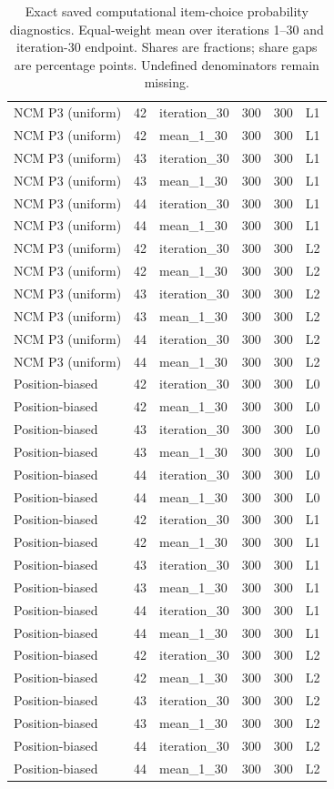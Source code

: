 \begin{table}[htbp!]
\begin{tabular}{lrlrrl}
NCM P3 (uniform) & 42 & iteration\_30 & 300 & 300 & L1 \\
NCM P3 (uniform) & 42 & mean\_1\_30 & 300 & 300 & L1 \\
NCM P3 (uniform) & 43 & iteration\_30 & 300 & 300 & L1 \\
NCM P3 (uniform) & 43 & mean\_1\_30 & 300 & 300 & L1 \\
NCM P3 (uniform) & 44 & iteration\_30 & 300 & 300 & L1 \\
NCM P3 (uniform) & 44 & mean\_1\_30 & 300 & 300 & L1 \\
NCM P3 (uniform) & 42 & iteration\_30 & 300 & 300 & L2 \\
NCM P3 (uniform) & 42 & mean\_1\_30 & 300 & 300 & L2 \\
NCM P3 (uniform) & 43 & iteration\_30 & 300 & 300 & L2 \\
NCM P3 (uniform) & 43 & mean\_1\_30 & 300 & 300 & L2 \\
NCM P3 (uniform) & 44 & iteration\_30 & 300 & 300 & L2 \\
NCM P3 (uniform) & 44 & mean\_1\_30 & 300 & 300 & L2 \\
Position-biased & 42 & iteration\_30 & 300 & 300 & L0 \\
Position-biased & 42 & mean\_1\_30 & 300 & 300 & L0 \\
Position-biased & 43 & iteration\_30 & 300 & 300 & L0 \\
Position-biased & 43 & mean\_1\_30 & 300 & 300 & L0 \\
Position-biased & 44 & iteration\_30 & 300 & 300 & L0 \\
Position-biased & 44 & mean\_1\_30 & 300 & 300 & L0 \\
Position-biased & 42 & iteration\_30 & 300 & 300 & L1 \\
Position-biased & 42 & mean\_1\_30 & 300 & 300 & L1 \\
Position-biased & 43 & iteration\_30 & 300 & 300 & L1 \\
Position-biased & 43 & mean\_1\_30 & 300 & 300 & L1 \\
Position-biased & 44 & iteration\_30 & 300 & 300 & L1 \\
Position-biased & 44 & mean\_1\_30 & 300 & 300 & L1 \\
Position-biased & 42 & iteration\_30 & 300 & 300 & L2 \\
Position-biased & 42 & mean\_1\_30 & 300 & 300 & L2 \\
Position-biased & 43 & iteration\_30 & 300 & 300 & L2 \\
Position-biased & 43 & mean\_1\_30 & 300 & 300 & L2 \\
Position-biased & 44 & iteration\_30 & 300 & 300 & L2 \\
Position-biased & 44 & mean\_1\_30 & 300 & 300 & L2 \\
\hline
\end{tabular}
\caption{Exact saved computational item-choice probability diagnostics. Equal-weight mean over iterations 1--30 and iteration-30 endpoint. Shares are fractions; share gaps are percentage points. Undefined denominators remain missing.}
\label{chap:results:tab:rq2_computational_saved_probability_coverage}
\end{table}
